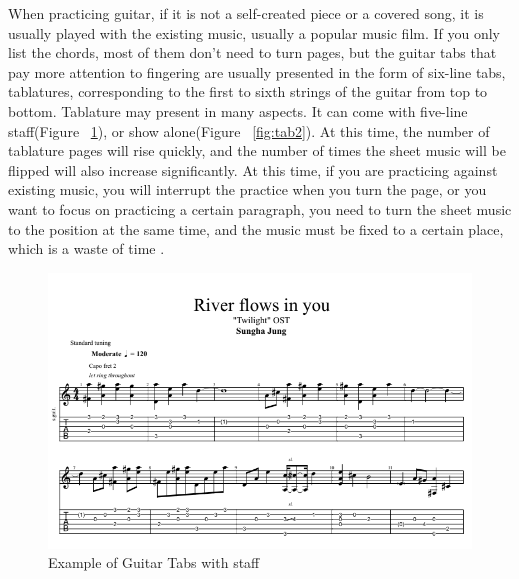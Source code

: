\documentclass[10pt,twocolumn,letterpaper]{article}
\begin{document}
\begin{CJK}{UTF8}{bsmi}
When practicing guitar, if it is not a self-created piece or a covered song, it is usually played with the existing music, usually a popular music film. If you only list the chords, most of them don’t need to turn pages, but the guitar tabs that pay more attention to fingering are usually presented in the form of six-line tabs, tablatures, corresponding to the first to sixth strings of the guitar from top to bottom. Tablature may present in many aspects. It can come with five-line staff(Figure ~\ref{fig:tab1}), or show alone(Figure ~\ref{fig:tab2}). At this time, the number of tablature pages will rise quickly, and the number of times the sheet music will be flipped will also increase significantly. At this time, if you are practicing against existing music, you will interrupt the practice when you turn the page, or you want to focus on practicing a certain paragraph, you need to turn the sheet music to the position at the same time, and the music must be fixed to a certain place, which is a waste of time .

\begin{figure}[t]
\begin{center}
   \includegraphics[width=0.9\linewidth]{tablature.png}
\end{center}
\caption{Example of Guitar Tabs with staff\cite{river_flows_in_you}}
\label{fig:long}
\label{fig:tab1}
\end{figure}


\end{CJK}
\end{document}
